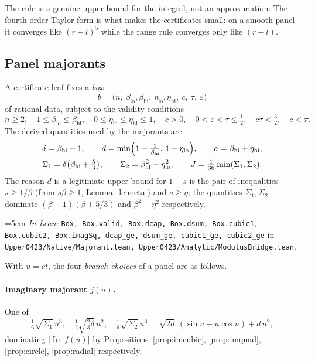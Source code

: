 \documentclass[11pt,a4paper]{article}
\theoremstyle{definition}
\newcommand{\Lean}[1]{\texttt{#1}}
\newcommand{\file}[1]{\texttt{#1}}
\newcommand{\formal}[2]{%
  \par\smallskip
  \begingroup\small\raggedright\emergencystretch=5em
  \noindent\textit{In Lean:} \Lean{#1} in \file{#2}.\par
  \endgroup\smallskip}
\begin{document}
The rule is a genuine upper bound for the integral, not an approximation. The
fourth-order Taylor form is what makes the certificates small: on a smooth panel
it converges like $(r-l)^5$ while the range rule converges only like $(r-l)$.

\subsection{Panel majorants}
\label{sec:modulus}

A certificate leaf fixes a \emph{box}
\[
  b=\bigl(n,\ \beta_{\mathrm{lo}},\beta_{\mathrm{hi}},\
  \eta_{\mathrm{lo}},\eta_{\mathrm{hi}},\ c,\ \tau,\ \varepsilon\bigr)
\]
of rational data, subject to the validity conditions
\[
  n\ge2,\quad
  1\le\beta_{\mathrm{lo}}\le\beta_{\mathrm{hi}},\quad
  0\le\eta_{\mathrm{lo}}\le\eta_{\mathrm{hi}}\le1,\quad
  c>0,\quad 0<\varepsilon<\tau\le\tfrac12,\quad
  c\tau<\tfrac32,\quad c<\pi .
\]
The derived quantities used by the majorants are
\begin{gather*}
  \delta=\beta_{\mathrm{hi}}-1,\qquad
  d=\min\Bigl(1-\tfrac1{\beta_{\mathrm{hi}}},\,1-\eta_{\mathrm{lo}}\Bigr),\qquad
  a=\beta_{\mathrm{hi}}+\eta_{\mathrm{hi}},\\
  \Sigma_1=\delta\bigl(\beta_{\mathrm{hi}}+\tfrac53\bigr),\qquad
  \Sigma_2=\beta_{\mathrm{hi}}^2-\eta_{\mathrm{lo}}^2,\qquad
  J=\tfrac{1}{36}\min(\Sigma_1,\Sigma_2) .
\end{gather*}
The reason $d$ is a legitimate upper bound for $1-s$ is the pair of inequalities
$s\ge1/\beta$ (from $s\beta\ge1$, Lemma~\ref{lem:eta}) and $s\ge\eta$; the
quantities $\Sigma_1,\Sigma_2$ dominate $(\beta-1)(\beta+5/3)$ and
$\beta^2-\eta^2$ respectively.
\formal{Box, Box.valid, Box.dcap, Box.dsum, Box.cubic1, Box.cubic2, Box.imagSq, dcap\_ge, dsum\_ge, cubic1\_ge, cubic2\_ge}{Upper0423/Native/Majorant.lean, Upper0423/Analytic/ModulusBridge.lean}

With $u=ct$, the four \emph{branch choices} of a panel are as follows.

\paragraph{Imaginary majorant $j(u)$.} One of
\[
  \tfrac16\sqrt{\Sigma_1}\,u^3,\quad
  \tfrac12\sqrt{\tfrac23\delta}\,u^2,\quad
  \tfrac16\sqrt{\Sigma_2}\,u^3,\quad
  \sqrt{2d}\,(\sin u-u\cos u)+d\,u^2,
\]
dominating $|\operatorname{Im}f(u)|$ by Propositions~\ref{prop:imcubic},
\ref{prop:imquad}, \ref{prop:circle}, \ref{prop:radial} respectively.
\end{document}
